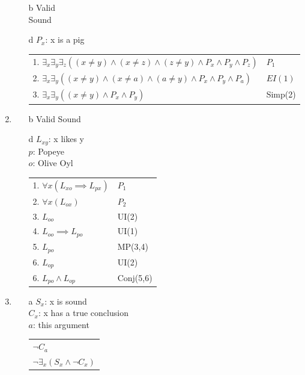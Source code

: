 \documentclass{article}
\begin{document}
\begin{enumerate}
			\begin{enumerate}
				\item[b]
					Valid\\
					Sound
				\item[d]
					$P_x$: x is a pig\\
					\begin{tabular}{l l}
						1. $\exists _x \exists _y \exists _z ((x \neq y)\land(x \neq z)\land(z \neq y)\land P_x \land P_y \land P_z)$ & $P_1$\\
						2. $\exists _x \exists _y ((x \neq y) \land (x \neq a) \land (a \neq y) \land P_x \land P_y \land P_a)$ & $EI(1)$\\
						3. $\exists _x \exists _y ((x \neq y)\land P_x \land P_y)$ & Simp(2)\\
					\end{tabular}
			\end{enumerate}
		\item
			\begin{enumerate}
				\item[b]
					Valid
					Sound
				\item[d]
					$L_{xy}$: x likes y\\
					$p$: Popeye\\
					$o$: Olive Oyl\\
					\begin{tabular}{l l}
						1. $\forall x (L_{xo} \implies L_{px})$ & $P_1$\\
						2. $\forall x (L_{ox})$ & $P_2$\\
						3. $L_{oo}$ & UI(2)\\
						4. $L_{oo} \implies L_{po}$ & UI(1)\\
						5. $L_{po}$ & MP(3,4)\\
						6. $L_{op}$ & UI(2)\\
						6. $L_{po} \land L_{op}$ & Conj(5,6)\\
					\end{tabular}
			\end{enumerate}
		\item
			\begin{enumerate}
				\item[a]
					$S_x$: x is sound\\
					$C_x$: x has a true conclusion\\
					$a$: this argument\\
					\begin{tabular}{l}
						$\lnot C_a$\\
						$\lnot \exists _x (S_x \land \lnot C_x)$\\ \hline

\end{tabular}
\end{enumerate}
\end{enumerate}
\end{document}
